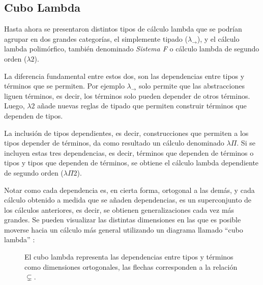 \subsection{Cubo Lambda}
Hasta ahora se presentaron distintos tipos de cálculo lambda que se podrían agrupar en dos grandes categorías, el simplemente tipado ($\lambda_{\to}$), y el cálculo lambda polimórfico, también denominado \textit{Sistema F} o cálculo lambda de segundo orden ($\lambda 2$).

La diferencia fundamental entre estos dos, son las dependencias entre tipos y términos que se permiten.
Por ejemplo $\lambda_{\to}$ solo permite que las abstracciones liguen términos, es decir, los términos solo pueden depender de otros términos.
Luego, $\lambda 2$ añade nuevas reglas de tipado que permiten construir términos que dependen de tipos.

La inclusión de tipos dependientes, es decir, construcciones que permiten a los tipos depender de términos, da como resultado un cálculo denominado $\lambda\Pi$.
Si se incluyen estas tres dependencias, es decir, términos que dependen de términos o tipos y tipos que dependen de términos, se obtiene el cálculo lambda dependiente de segundo orden ($\lambda\Pi 2$).

Notar como cada dependencia es, en cierta forma, ortogonal a las demás, y cada cálculo obtenido a medida que se añaden dependencias, es un superconjunto de los cálculos anteriores, es decir, se obtienen generalizaciones cada vez más grandes.
Se pueden visualizar las distintas dimensiones en las que es posible moverse hacia un cálculo más general utilizando un diagrama llamado ``cubo lambda'' \cite{lambda_cube}:

\begin{figure}[H]
	\centering
	\caption{El cubo lambda representa las dependencias entre tipos y términos como dimensiones ortogonales, las flechas corresponden a la relación $\subsetneq$.}
\end{figure}

